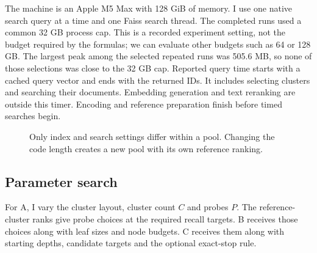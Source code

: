 The machine is an Apple M5 Max with 128 GiB of memory. I use one native search query at a time and one Faiss search thread. The completed runs used a common 32 GB process cap. This is a recorded experiment setting, not the budget required by the formulas; we can evaluate other budgets such as 64 or 128 GB. The largest peak among the selected repeated runs was 505.6 MB, so none of those selections was close to the 32 GB cap. Reported query time starts with a cached query vector and ends with the returned IDs. It includes selecting clusters and searching their documents. Embedding generation and text reranking are outside this timer. Encoding and reference preparation finish before timed searches begin.


\begin{figure}[htbp]\centering
{}
\caption{Only index and search settings differ within a pool. Changing the code length creates a new pool with its own reference ranking.}
\end{figure}

\subsection{Parameter search}
For A, I vary the cluster layout, cluster count $C$ and probes $P$. The reference-cluster ranks give probe choices at the required recall targets. B receives those choices along with leaf sizes and node budgets. C receives them along with starting depths, candidate targets and the optional exact-stop rule.

